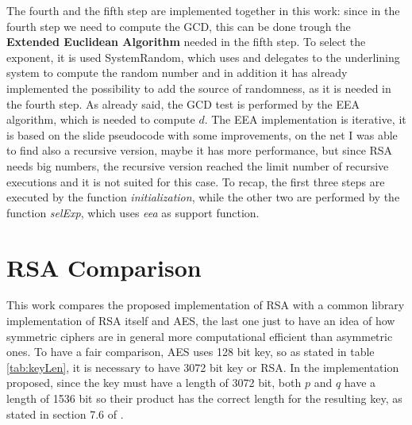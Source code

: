 \documentclass{article}
\begin{document}
The fourth and the fifth step are implemented together in this work: since in the fourth step we need to compute the GCD, this can be done trough the \textbf{Extended Euclidean Algorithm} needed in the fifth step. To select the exponent, it is used SystemRandom, which uses and delegates to the underlining system to compute the random number and in addition it has already implemented the possibility to add the source of randomness, as it is needed in the fourth step. As already said, the GCD test is performed by the EEA algorithm, which is needed to compute $d$. The EEA implementation is iterative, it is based on the slide pseudocode with some improvements, on the net I was able to find also a recursive version, maybe it has more performance, but since RSA needs big numbers, the recursive version reached the limit number of recursive executions and it is not suited for this case.\newline
To recap, the first three steps are executed by the function \textit{initialization}, while the other two are performed by the function \textit{selExp}, which uses \textit{eea} as support function.


\section{RSA Comparison}

This work compares the proposed implementation of RSA with a common library implementation of RSA itself and AES, the last one just to have an idea of how symmetric ciphers are in general more computational efficient than asymmetric ones. To have a fair comparison, AES uses 128 bit key, so as stated in table \ref{tab:keyLen}, it is necessary to have 3072 bit key or RSA. In the implementation proposed, since the key must have a length of 3072 bit, both $p$ and $q$ have a length of 1536 bit so their product has the correct length for the resulting key, as stated in section 7.6 of \cite{10.5555/1721909}.

\renewcommand{\arraystretch}{2}
\end{document}
